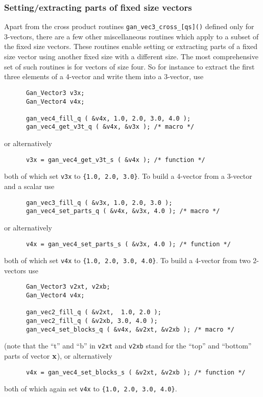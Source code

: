 \subsubsection{Setting/extracting parts of fixed size vectors}
Apart from the cross product routines {\tt gan\_vec3\_cross\_[qs]()}
defined only for 3-vectors, there are a few other miscellaneous routines which
apply to a subset of the fixed size vectors. These routines enable setting
or extracting parts of a fixed size vector using another fixed size with
a different size. The most comprehensive set of such routines is for
vectors of size four. So for instance to extract the first three elements
of a 4-vector and write them into a 3-vector, use
\begin{verbatim}
      Gan_Vector3 v3x;
      Gan_Vector4 v4x;

      gan_vec4_fill_q ( &v4x, 1.0, 2.0, 3.0, 4.0 );
      gan_vec4_get_v3t_q ( &v4x, &v3x ); /* macro */
\end{verbatim}
or alternatively
\begin{verbatim}
      v3x = gan_vec4_get_v3t_s ( &v4x ); /* function */
\end{verbatim}
both of which set {\tt v3x} to {\tt \{1.0, 2.0, 3.0\}}.
To build a 4-vector from a 3-vector and a scalar use
\begin{verbatim}
      gan_vec3_fill_q ( &v3x, 1.0, 2.0, 3.0 );
      gan_vec4_set_parts_q ( &v4x, &v3x, 4.0 ); /* macro */
\end{verbatim}
or alternatively
\begin{verbatim}
      v4x = gan_vec4_set_parts_s ( &v3x, 4.0 ); /* function */
\end{verbatim}
both of which set {\tt v4x} to {\tt \{1.0, 2.0, 3.0, 4.0\}}.
To build a 4-vector from two 2-vectors use
\begin{verbatim}
      Gan_Vector3 v2xt, v2xb;
      Gan_Vector4 v4x;

      gan_vec2_fill_q ( &v2xt,  1.0, 2.0 );
      gan_vec2_fill_q ( &v2xb, 3.0, 4.0 );
      gan_vec4_set_blocks_q ( &v4x, &v2xt, &v2xb ); /* macro */
\end{verbatim}
(note that the ``t'' and ``b'' in {\tt v2xt} and {\tt v2xb} stand for the
``top'' and ``bottom'' parts of vector ${\bf x}$), or alternatively
\begin{verbatim}
      v4x = gan_vec4_set_blocks_s ( &v2xt, &v2xb ); /* function */
\end{verbatim}
both of which again set {\tt v4x} to {\tt \{1.0, 2.0, 3.0, 4.0\}}.

